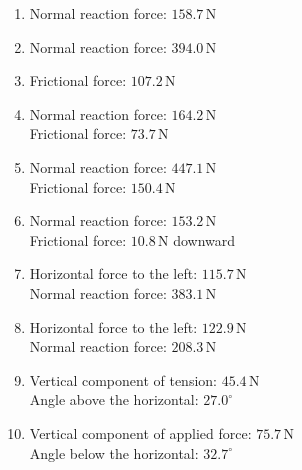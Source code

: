 \documentclass[12pt,a4paper]{article}
\begin{document}
\begin{enumerate}[leftmargin=*, itemsep=1em]

\item
Normal reaction force: \(158.7\,\mathrm{N}\)

\item
Normal reaction force: \(394.0\,\mathrm{N}\)

\item
Frictional force: \(107.2\,\mathrm{N}\)

\item
Normal reaction force: \(164.2\,\mathrm{N}\) \\
Frictional force: \(73.7\,\mathrm{N}\)

\item
Normal reaction force: \(447.1\,\mathrm{N}\) \\
Frictional force: \(150.4\,\mathrm{N}\)

\item
Normal reaction force: \(153.2\,\mathrm{N}\) \\
Frictional force: \(10.8\,\mathrm{N}\) downward

\item
Horizontal force to the left: \(115.7\,\mathrm{N}\) \\
Normal reaction force: \(383.1\,\mathrm{N}\)

\item
Horizontal force to the left: \(122.9\,\mathrm{N}\) \\
Normal reaction force: \(208.3\,\mathrm{N}\)

\item
Vertical component of tension: \(45.4\,\mathrm{N}\) \\
Angle above the horizontal: \(27.0^\circ\)

\item
Vertical component of applied force: \(75.7\,\mathrm{N}\) \\
Angle below the horizontal: \(32.7^\circ\)

\end{enumerate}
\end{document}
